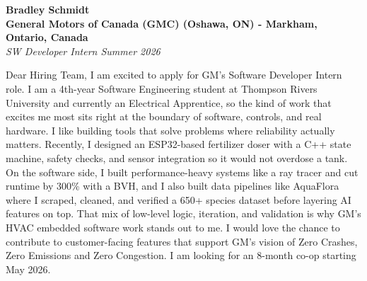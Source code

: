 \documentclass[11pt]{article}
\begin{document}
\textbf{Bradley Schmidt}\\
\vspace{0.5em}
\textbf{General Motors of Canada (GMC) (Oshawa, ON) - Markham, Ontario, Canada}\\
\textit{SW Developer Intern Summer 2026}

Dear Hiring Team, I am excited to apply for GM's Software Developer Intern role. I am a 4th-year Software Engineering student at Thompson Rivers University and currently an Electrical Apprentice, so the kind of work that excites me most sits right at the boundary of software, controls, and real hardware. I like building tools that solve problems where reliability actually matters. Recently, I designed an ESP32-based fertilizer doser with a C++ state machine, safety checks, and sensor integration so it would not overdose a tank. On the software side, I built performance-heavy systems like a ray tracer and cut runtime by 300\% with a BVH, and I also built data pipelines like AquaFlora where I scraped, cleaned, and verified a 650+ species dataset before layering AI features on top. That mix of low-level logic, iteration, and validation is why GM's HVAC embedded software work stands out to me. I would love the chance to contribute to customer-facing features that support GM's vision of Zero Crashes, Zero Emissions and Zero Congestion. I am looking for an 8-month co-op starting May 2026.
\end{document}
